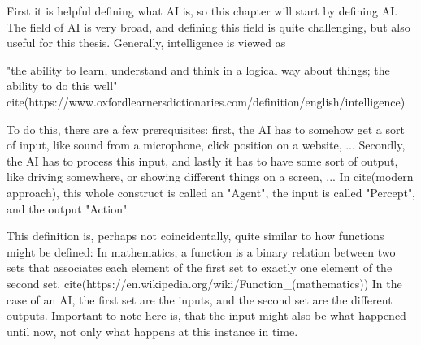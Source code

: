 First it is helpful defining what AI is, so this chapter will start by defining AI.
The field of AI is very broad, and defining this field is quite challenging, but also useful for this thesis. Generally, intelligence is viewed as 

"the ability to learn, understand and think in a logical way about things; the ability to do this well" cite(https://www.oxfordlearnersdictionaries.com/definition/english/intelligence)

To do this, there are a few prerequisites: first, the AI has to somehow get a sort of input, like sound from a microphone, click position on a website, ... 
Secondly, the AI has to process this input, 
and lastly it has to have some sort of output, like driving somewhere, or showing different things on a screen, ... 
In cite(modern approach), this whole construct is called an "Agent", the input is called "Percept", and the output "Action"

This definition is, perhaps not coincidentally, quite similar to how functions might be defined: 
In mathematics, a function is a binary relation between two sets that associates each element of the first set to exactly one element of the second set. cite(https://en.wikipedia.org/wiki/Function_(mathematics))
In the case of an AI, the first set are the inputs, and the second set are the different outputs. 
Important to note here is, that the input might also be what happened until now, not only what happens at this instance in time.

